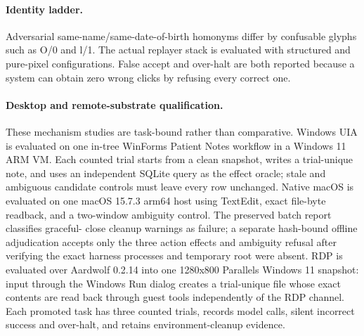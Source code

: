 \paragraph{Identity ladder.}
Adversarial same-name/same-date-of-birth homonyms differ by confusable glyphs
such as O/0 and l/1. The actual replayer stack is evaluated with structured and
pure-pixel configurations. False accept and over-halt are both reported because
a system can obtain zero wrong clicks by refusing every correct one.

\paragraph{Desktop and remote-substrate qualification.}
These mechanism studies are task-bound rather than comparative. Windows UIA is
evaluated on one in-tree WinForms Patient Notes workflow in a Windows 11 ARM VM.
Each counted trial starts from a clean snapshot, writes a trial-unique note, and
uses an independent SQLite query as the effect oracle; stale and ambiguous
candidate controls must leave every row unchanged. Native macOS is evaluated on
one macOS 15.7.3 arm64 host using TextEdit, exact file-byte readback, and a
two-window ambiguity control. The preserved batch report classifies graceful-
close cleanup warnings as failure; a separate hash-bound offline adjudication
accepts only the three action effects and ambiguity refusal after verifying the
exact harness processes and temporary root were absent. RDP is evaluated over
Aardwolf 0.2.14 into one 1280x800 Parallels Windows 11 snapshot: input through
the Windows Run dialog creates a trial-unique file whose exact contents are read
back through guest tools independently of the RDP channel. Each promoted task
has three counted trials, records model calls, silent incorrect success and
over-halt, and retains environment-cleanup evidence.
